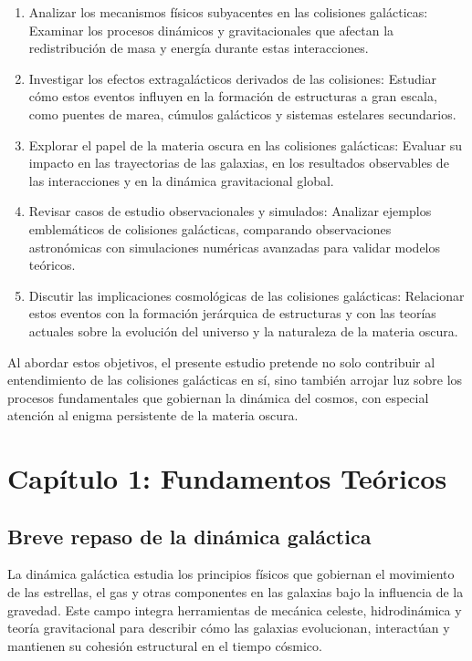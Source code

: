 \documentclass{article}
\begin{document}
\begin{enumerate}
    \item Analizar los mecanismos físicos subyacentes en las colisiones galácticas: Examinar los procesos dinámicos y gravitacionales que afectan la redistribución de masa y energía durante estas interacciones.
    \item Investigar los efectos extragalácticos derivados de las colisiones: Estudiar cómo estos eventos influyen en la formación de estructuras a gran escala, como puentes de marea, cúmulos galácticos y sistemas estelares secundarios.
    \item Explorar el papel de la materia oscura en las colisiones galácticas: Evaluar su impacto en las trayectorias de las galaxias, en los resultados observables de las interacciones y en la dinámica gravitacional global.
    \item Revisar casos de estudio observacionales y simulados: Analizar ejemplos emblemáticos de colisiones galácticas, comparando observaciones astronómicas con simulaciones numéricas avanzadas para validar modelos teóricos.
    \item Discutir las implicaciones cosmológicas de las colisiones galácticas: Relacionar estos eventos con la formación jerárquica de estructuras y con las teorías actuales sobre la evolución del universo y la naturaleza de la materia oscura.
\end{enumerate}
Al abordar estos objetivos, el presente estudio pretende no solo contribuir al entendimiento de las colisiones galácticas en sí, sino también arrojar luz sobre los procesos fundamentales que gobiernan la dinámica del cosmos, con especial atención al enigma persistente de la materia oscura. \\

\section{Capítulo 1: Fundamentos Teóricos}
\subsection{Breve repaso de la dinámica galáctica}
La dinámica galáctica estudia los principios físicos que gobiernan el movimiento de las estrellas, el gas y otras componentes en las galaxias bajo la influencia de la gravedad. Este campo integra herramientas de mecánica celeste, hidrodinámica y teoría gravitacional para describir cómo las galaxias evolucionan, interactúan y mantienen su cohesión estructural en el tiempo cósmico. \\
\end{document}
